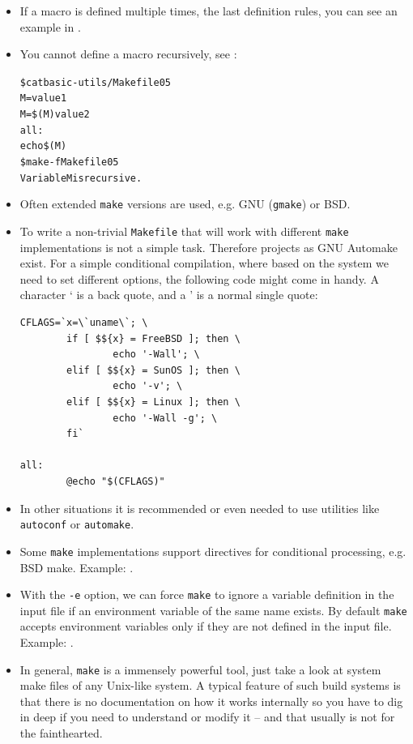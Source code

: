 \begin{itemize}
\item If a macro is defined multiple times, the last definition rules, you can
see an example in .
\item You cannot define a macro recursively, see
:

\begin{alltt}
\$ cat basic-utils/Makefile05
M=value1
M=\$(M) value2
all:
        echo \$(M)
\$ make -f Makefile05
Variable M is recursive.
\end{alltt}
\item Often extended \texttt{make} versions are used, e.g. GNU (\texttt{gmake})
or BSD.
\item To write a non-trivial \texttt{Makefile} that will work with
different \texttt{make} implementations is not a simple task.  Therefore
projects as GNU Automake exist.  For a simple conditional compilation, where
based on the system we need to set different options, the following code might
come in handy.  A character ` is a back quote, and a ' is a normal single quote:

\begin{verbatim}
CFLAGS=`x=\`uname\`; \
        if [ $${x} = FreeBSD ]; then \
                echo '-Wall'; \
        elif [ $${x} = SunOS ]; then \
                echo '-v'; \
        elif [ $${x} = Linux ]; then \
                echo '-Wall -g'; \
        fi`

all:
        @echo "$(CFLAGS)"
\end{verbatim}

\item In other situations it is recommended or even needed to use utilities like
\texttt{autoconf} or \texttt{automake}.
\item Some \texttt{make} implementations support directives for conditional
processing, e.g.  BSD make.  Example: .
\item With the \texttt{-e} option, we can force \texttt{make} to ignore a
variable definition in the input file if an environment variable of the same
name exists.  By default \texttt{make} accepts environment variables only if
they are not defined in the input file.  Example:
\example{basic-utils/Makefile06}.
\item In general, \texttt{make} is a immensely powerful tool, just take a look
at system make files of any Unix-like system.  A typical feature of such build
systems is that there is no documentation on how it works internally so you have
to dig in deep if you need to understand or modify it -- and that usually is not
for the fainthearted.
\end{itemize}


